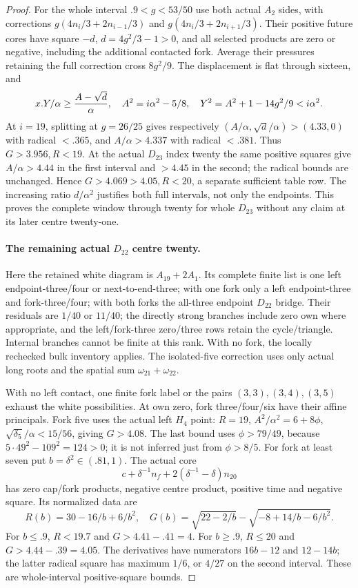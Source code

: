 \begin{proof}
For the whole interval $.9<g<53/50$ use both actual $A_2$ sides,
with corrections $g(4n_i/3+2n_{i-1}/3)$ and
$g(4n_i/3+2n_{i+1}/3)$. Their positive future cores have square
$-d$, $d=4g^2/3-1>0$, and all selected products are zero or
negative, including the additional contacted fork. Average their
pressures retaining the full correction cross $8g^2/9$.
The displacement is flat through sixteen, and
\[
 x.Y/\alpha\ge{A-\sqrt d\over\alpha},\quad
 A^2=i\alpha^2-5/8,\quad
 Y^2=A^2+1-14g^2/9<i\alpha^2.
\]
At $i=19$, splitting at $g=26/25$ gives respectively
$(A/\alpha,\sqrt d/\alpha)>(4.33,0)$ with radical $<.365$,
and $A/\alpha>4.337$ with radical $<.381$. Thus $G>3.956,R<19$.
At the actual $D_{23}$ index twenty the same positive squares give
$A/\alpha>4.44$ in the first interval and $>4.45$ in the second;
the radical bounds are unchanged. Hence $G>4.069>4.05,R<20$,
a separate sufficient table row. The increasing ratio $d/\alpha^2$
justifies both full intervals, not only the endpoints. This proves
the complete window through twenty for whole $D_{23}$ without any
claim at its later centre twenty-one.

\paragraph{The remaining actual $D_{22}$ centre twenty.}
Here the retained white diagram is $A_{19}+2A_1$. Its complete
finite list is one left endpoint-three/four or next-to-end-three;
with one fork only a left endpoint-three and fork-three/four;
with both forks the all-three endpoint $D_{22}$ bridge.
Their residuals are $1/40$ or $11/40$; the directly strong
branches include zero own where appropriate, and the left/fork-three
zero/three rows retain the cycle/triangle. Internal branches cannot
be finite at this rank. With no fork, the locally rechecked bulk
inventory applies. The isolated-five correction uses only actual
long roots and the spatial sum $\omega_{21}+\omega_{22}$.

With no left contact, one finite fork label or the pairs
$(3,3),(3,4),(3,5)$ exhaust the white possibilities. At own zero,
fork three/four/six have their affine principals. Fork five uses
the actual left $H_4$ point: $R=19$, $A^2/\alpha^2=6+8\phi$,
$\sqrt{\delta_5}/\alpha<15/56$, giving $G>4.08$.
The last bound uses $\phi>79/49$, because
$5\cdot49^2-109^2=124>0$; it is not inferred just from $\phi>8/5$.
For fork at least seven put $b=\delta^2\in(.81,1)$. The actual core
\[
 c+\delta^{-1}n_f+2(\delta^{-1}-\delta)n_{20}
\]
has zero cap/fork products, negative centre product, positive time
and negative square. Its normalized data are
\[
 R(b)=30-16/b+6/b^2,\quad
 G(b)=\sqrt{22-2/b}-\sqrt{-8+14/b-6/b^2}.
\]
For $b\le.9$, $R<19.7$ and $G>4.41-.41=4$.
For $b\ge.9$, $R\le20$ and $G>4.44-.39=4.05$.
The derivatives have numerators $16b-12$ and $12-14b$;
the latter radical square has maximum $1/6$, or $4/27$ on the
second interval. These are whole-interval positive-square bounds.


\end{proof}
